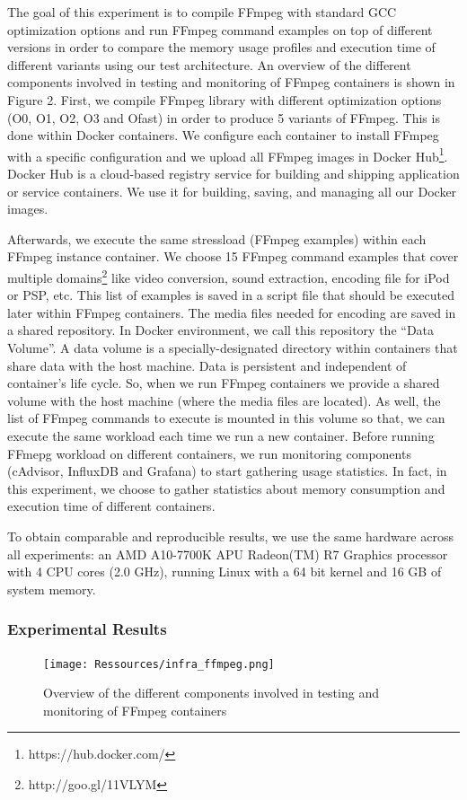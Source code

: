 The goal of this experiment is to compile FFmpeg with standard GCC optimization options and run FFmpeg command examples on top of different versions in order to compare the memory usage profiles and execution time of different variants using our test architecture. An overview of the different components involved in testing and monitoring of FFmpeg containers is shown in Figure 2. 
First, we compile FFmpeg library with different optimization options  (O0, O1, O2, O3 and Ofast) in order to produce 5 variants of FFmpeg. This is done within Docker containers. We configure each container to install FFmpeg with a specific configuration and we upload all FFmpeg images in Docker Hub\footnote{https://hub.docker.com/}.
Docker Hub is a cloud-based registry service for building and shipping application or service containers. We use it for building, saving, and managing all our Docker images.

Afterwards, we execute the same stressload (FFmpeg examples) within each FFmpeg instance container. We choose 15 FFmpeg command examples that cover multiple domains\footnote{http://goo.gl/11VLYM} like video conversion, sound extraction, encoding file for iPod or PSP, etc. This list of examples is saved in a script file that should be executed later within FFmpeg containers. The media files needed for encoding are saved in a shared repository. In Docker environment, we call this repository the “Data Volume”. A data volume is a specially-designated directory within containers that share data with the host machine. Data is persistent and independent of container's life cycle. So, when we run FFmpeg containers we provide a shared volume with the host machine (where the media files are located). As well, the list of FFmpeg commands to execute is mounted in this volume so that, we can execute the same workload each time we run a new container.
Before running FFmepg workload on different containers, we run monitoring components (cAdvisor, InfluxDB and Grafana) to start gathering usage statistics.
In fact, in this experiment, we choose to gather statistics about memory consumption and execution time of different containers. 

To obtain comparable and reproducible results, we use the same hardware across all experiments: an AMD A10-7700K APU Radeon(TM) R7 Graphics processor with 4 CPU cores (2.0 GHz), running Linux with a 64 bit kernel and 16 GB of system memory.

\subsubsection{Experimental Results}
\begin{figure}[!t]
	\centering
	\texttt{[image: Ressources/infra\_ffmpeg.png]}
	\caption{Overview of the different components involved in testing and monitoring of FFmpeg containers}
\end{figure}


